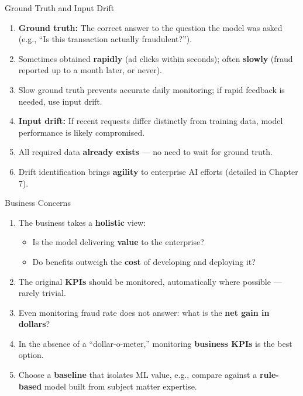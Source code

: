 \begin{frame}{Ground Truth and Input Drift}
\begin{enumerate}
\item<1-> \textbf{Ground truth:} The correct answer to the question the model was asked (e.g., ``Is this transaction actually fraudulent?'').
\item<2-> Sometimes obtained \textbf{rapidly} (ad clicks within seconds); often \textbf{slowly} (fraud reported up to a month later, or never).
\item<3-> Slow ground truth prevents accurate daily monitoring; if rapid feedback is needed, use input drift.
\item<4-> \textbf{Input drift:} If recent requests differ distinctly from training data, model performance is likely compromised.
\item<5-> All required data \textbf{already exists} --- no need to wait for ground truth.
\item<6-> Drift identification brings \textbf{agility} to enterprise AI efforts (detailed in Chapter 7).
\end{enumerate}
\end{frame}

\begin{frame}{Business Concerns}
\begin{enumerate}
\item<1-> The business takes a \textbf{holistic} view:
    \begin{itemize}
    \item Is the model delivering \textbf{value} to the enterprise?
    \item Do benefits outweigh the \textbf{cost} of developing and deploying it?
    \end{itemize}
\item<2-> The original \textbf{KPIs} should be monitored, automatically where possible --- rarely trivial.
\item<3-> Even monitoring fraud rate does not answer: what is the \textbf{net gain in dollars}?
\item<4-> In the absence of a ``dollar-o-meter,'' monitoring \textbf{business KPIs} is the best option.
\item<5-> Choose a \textbf{baseline} that isolates ML value, e.g., compare against a \textbf{rule-based} model built from subject matter expertise.
\end{enumerate}
\end{frame}

